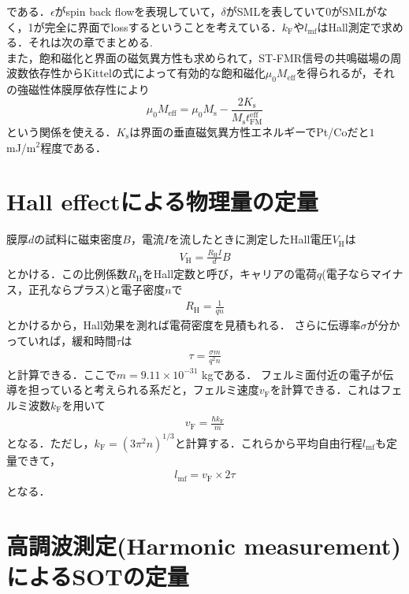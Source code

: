 \documentclass[12pt]{jsbook}
\begin{document}
である．$\epsilon$がspin back flowを表現していて，$\delta$がSMLを表していて0がSMLがなく，1が完全に界面でlossするということを考えている．$k_{\mathrm{F}}$や$l_{\mathrm{mf}}$はHall測定で求める．それは次の章でまとめる.\\




また，飽和磁化と界面の磁気異方性も求められて，ST-FMR信号の共鳴磁場の周波数依存性からKittelの式によって有効的な飽和磁化$\mu_{0} M_{\mathrm{eff}}$を得られるが，それの強磁性体膜厚依存性により
\begin{equation}
\mu_{0} M_{\mathrm{eff}}=\mu_{0} M_{\mathrm{s}}-\frac{2 K_{\mathrm{s}}}{M_{\mathrm{s}} t_{\mathrm{FM}}^{\mathrm{eff}}}
\end{equation}
という関係を使える．$K_\mathrm{s}$は界面の垂直磁気異方性エネルギーでPt/Coだと$1$ mJ/m$^2$程度である．

\chapter{Hall effectによる物理量の定量}
膜厚$d$の試料に磁束密度$B$，電流$I$を流したときに測定したHall電圧$V_\mathrm{H}$は
\begin{eqnarray}
	V_\mathrm{H} = \frac{R_\mathrm{H}I}{d}B
\end{eqnarray}
とかける．この比例係数$R_\mathrm{H}$をHall定数と呼び，キャリアの電荷$q$(電子ならマイナス，正孔ならプラス)と電子密度$n$で
\begin{eqnarray}
	R_\mathrm{H} = \frac{1}{qn}
\end{eqnarray}
とかけるから，Hall効果を測れば電荷密度を見積もれる．
さらに伝導率$\sigma$が分かっていれば，緩和時間$\tau$は
\begin{eqnarray}
	\tau = \frac{\sigma m }{q^2 n}
\end{eqnarray}
と計算できる．ここで$m = 9.11\times10^{-31}$ kgである．
フェルミ面付近の電子が伝導を担っていると考えられる系だと，フェルミ速度$v_\mathrm{F}$を計算できる．これはフェルミ波数$k_\mathrm{F}$を用いて
\begin{eqnarray}
	v_\mathrm{F} = \frac{\hbar k_\mathrm{F}}{m}
\end{eqnarray}
となる．ただし，$k_\mathrm{F} = (3\pi^2 n )^{1/3}$と計算する．これらから平均自由行程$l_\mathrm{mf}$も定量できて，
\begin{eqnarray}
	l_\mathrm{mf} = v_\mathrm{F}\times2\tau
\end{eqnarray}
となる．
\chapter{高調波測定(Harmonic measurement)によるSOTの定量}

\end{document}
